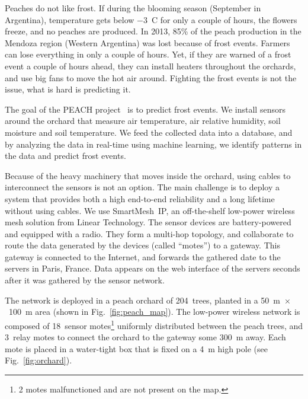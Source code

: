 \documentclass{elsarticle}
\newcommand{\smip}                {SmartMesh~IP\xspace}
\begin{document}

Peaches do not like frost.
If during the blooming season (September in Argentina), temperature gets below $-$3~C for only a couple of hours, the flowers freeze, and no peaches are produced.
In 2013, 85\% of the peach production in the Mendoza region (Western Argentina) was lost because of frost events.
Farmers can lose everything in only a couple of hours.
Yet, if they are warned of a frost event a couple of hours ahead, they can install heaters throughout the orchards, and use big fans to move the hot air around.
Fighting the frost events is not the issue, what is hard is predicting it.


The goal of the PEACH project~\cite{watteyne16peach} is to predict frost events.
We install sensors around the orchard that measure air temperature, air relative humidity, soil moisture and soil temperature.
We feed the collected data into a database, and by analyzing the data in real-time using machine learning, we identify patterns in the data and predict frost events.


Because of the heavy machinery that moves inside the orchard, using cables to interconnect the sensors is not an option.
The main challenge is to deploy a system that provides both a high end-to-end reliability and a long lifetime without using cables.
We use \smip, an off-the-shelf low-power wireless mesh solution from Linear Technology.
The sensor devices are battery-powered and equipped with a radio.
They form a multi-hop topology, and collaborate to route the data generated by the devices (called ``motes'') to a gateway.
This gateway is connected to the Internet, and forwards the gathered date to the servers in Paris, France.
Data appears on the web interface of the servers seconds after it was gathered by the sensor network.


The network is deployed in a peach orchard of 204~trees, planted in a 50~m~$\times$~100~m area (shown in Fig.~\ref{fig:peach_map}).
The low-power wireless network is composed of 18~sensor motes\footnote{2 motes malfunctioned and are not present on the map.} uniformly distributed between the peach trees, and 3~relay motes to connect the orchard to the gateway some 300~m away.
Each mote is placed in a water-tight box that is fixed on a 4~m high pole (see Fig.~\ref{fig:orchard}).
\end{document}
